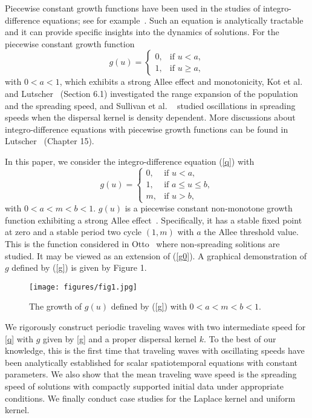\documentclass[11pt]{article}
\theoremstyle{definition}
\numberwithin{equation}{section}
\numberwithin{thm}{section}
\renewcommand{\a}{a}
\renewcommand{\b}{b}
\newcommand{\m}{m}
\newcommand{\mtwo}{1}
\begin{document}
Piecewise constant growth functions have been used in the studies of integro-difference equations; see for example~\cite{kot1, lut, otto, pnas}.
Such an equation is analytically tractable and it can provide specific insights into the dynamics of solutions.
For the piecewise constant growth function
\begin{equation} \label{g0}
g(u) = \begin{cases}
0, & \text{if } u < \a, \\
1, & \text{if } u \geq \a,
\end{cases}
\end{equation}
with $0<a<1$, which exhibits a strong Allee effect and monotonicity, Kot et al.~\cite{kot1} and Lutscher~\cite{lut} (Section 6.1) investigated the range expansion of the population and the spreading speed, and Sullivan et al.
~\cite{pnas} studied oscillations in spreading speeds when the dispersal kernel is density dependent.
More discussions about integro-difference equations with piecewise growth functions can be found in Lutscher~\cite{lut} (Chapter 15). 

In this paper, we consider the integro-difference equation (\ref{q}) with 
\begin{equation} \label{g}
g(u) = \begin{cases}
0, & \text{if } u < \a, \\
\mtwo, & \text{if } \a \leq u \leq \b, \\
\m, & \text{if } u > \b,
\end{cases}
\end{equation}
with $0<\a<\m<\b<1$.
$g(u)$ is a piecewise constant non-monotone growth function exhibiting a strong Allee effect~\cite{all}.
Specifically, it has a stable fixed point at zero and a stable period two cycle $(1,\m)$ with $\a$ the Allee threshold value.
This is the function considered in Otto~\cite{otto} where non-spreading solitions are studied.
It may be viewed as an extension of (\ref{g0}).
A graphical demonstration of $g$ defined by (\ref{g}) is given by Figure 1.
\begin{figure}[h!]
\centering
 \caption{The growth of $g(u)$ defined by (\ref{g}) with $0<\a<\m<\b<1$.}
 \texttt{[image: figures/fig1.jpg]}
\end{figure}
We rigorously construct periodic traveling waves with two intermediate speed for \eqref{q} with $g$ given by \eqref{g} and a proper dispersal kernel $k$.
To the best of our knowledge, this is the first time that traveling waves with oscillating speeds have been analytically established for scalar spatiotemporal equations with constant parameters.
We also show that the mean traveling wave speed is the spreading speed of solutions with compactly supported initial data under appropriate conditions.
We finally conduct case studies for the Laplace kernel and uniform kernel.
\end{document}
